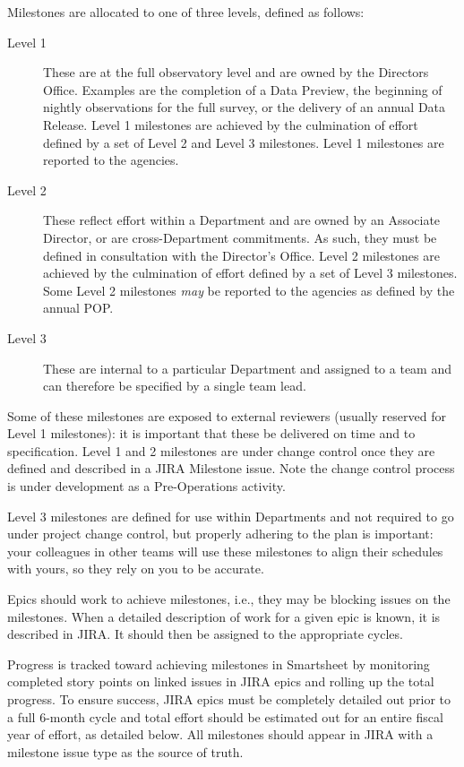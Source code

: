 Milestones are allocated to one of three levels, defined as follows:

\begin{description}
\item[Level 1] These are at the full observatory level and are owned by the Directors Office.
Examples are the completion of a Data Preview, the beginning of nightly observations for the full survey, or the delivery of an annual Data Release.
Level 1 milestones are achieved by the culmination of effort defined by a set of Level 2 and Level 3 milestones.
Level 1 milestones are reported to the agencies.
\item[Level 2] These reflect effort within a Department and are owned by an Associate Director, or are cross-Department commitments.
As such, they must be defined in consultation with the Director's Office.
Level 2 milestones are achieved by the culmination of effort defined by a set of Level 3 milestones.
Some Level 2 milestones {\it may} be reported to the agencies as defined by the annual POP.
\item[Level 3] These are internal to a particular Department and assigned to a team and can therefore be specified by a single team lead.
\end{description}

Some of these milestones are exposed to external reviewers (usually reserved for Level 1 milestones): it is important that these be delivered on time and to specification.
Level 1 and 2 milestones are under change control once they are defined and described in a \gls{JIRA} Milestone issue. Note the change control process is under development as a Pre-Operations activity. 

Level 3 milestones are defined for use within Departments and not required to go under project change control, but properly adhering to the plan is important: your colleagues in other teams will use these milestones to align their schedules with yours, so they rely on you to be accurate.

Epics should work to achieve milestones, i.e., they may be blocking issues on the milestones.
When a detailed description of work for a given \gls{epic} is known, it is described in \gls{JIRA}.
It should then be assigned to the appropriate \glspl{cycle}.

Progress is tracked toward achieving milestones in Smartsheet by monitoring completed story points on linked issues in \gls{JIRA} epics and rolling up the total progress.
To ensure success, \gls{JIRA} epics must be completely detailed out prior to a full 6-month cycle and total effort should be estimated out for an entire fiscal year of effort, as detailed below.
All milestones should appear in \gls{JIRA} with a milestone issue type as the source of truth. 

